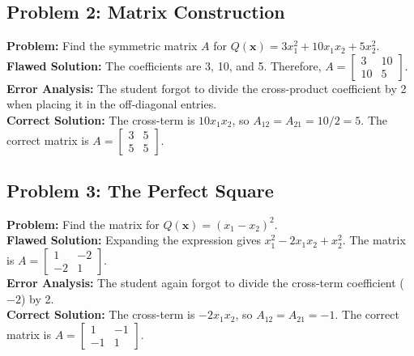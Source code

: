 \documentclass[11pt, letterpaper]{article}
\theoremstyle{definition}
\theoremstyle{remark}
\newcommand{\x}{\mathbf{x}}
\begin{document}
\subsection{Problem 2: Matrix Construction}
\textbf{Problem:} Find the symmetric matrix $A$ for $Q(\x) = 3x_1^2 + 10x_1 x_2 + 5x_2^2$. \\
\textbf{Flawed Solution:} The coefficients are 3, 10, and 5. Therefore, $A = \begin{bmatrix} 3 & 10 \\ 10 & 5 \end{bmatrix}$. \\
\textbf{Error Analysis:} The student forgot to divide the cross-product coefficient by 2 when placing it in the off-diagonal entries. \\
\textbf{Correct Solution:} The cross-term is $10x_1 x_2$, so $A_{12} = A_{21} = 10/2 = 5$. The correct matrix is $A = \begin{bmatrix} 3 & 5 \\ 5 & 5 \end{bmatrix}$.

\subsection{Problem 3: The Perfect Square}
\textbf{Problem:} Find the matrix for $Q(\x) = (x_1 - x_2)^2$. \\
\textbf{Flawed Solution:} Expanding the expression gives $x_1^2 - 2x_1 x_2 + x_2^2$. The matrix is $A = \begin{bmatrix} 1 & -2 \\ -2 & 1 \end{bmatrix}$. \\
\textbf{Error Analysis:} The student again forgot to divide the cross-term coefficient ($-2$) by 2. \\
\textbf{Correct Solution:} The cross-term is $-2x_1 x_2$, so $A_{12} = A_{21} = -1$. The correct matrix is $A = \begin{bmatrix} 1 & -1 \\ -1 & 1 \end{bmatrix}$.
\end{document}
